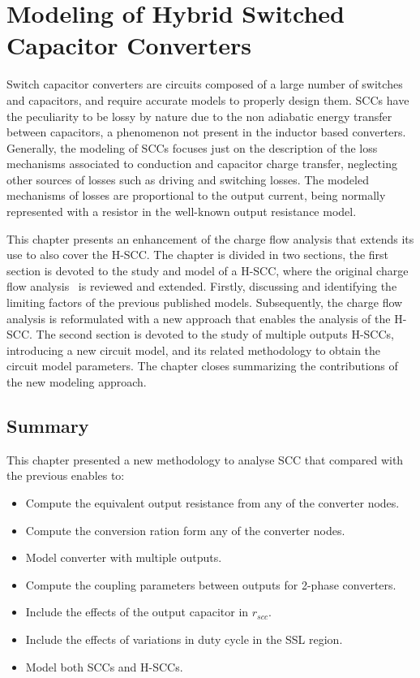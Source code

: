 \chapter[Modeling of H-SCC]{Modeling of Hybrid Switched Capacitor Converters}
\label{ch:modeling}
Switch capacitor converters are circuits composed of a large number of switches and capacitors, and require accurate models to properly design them. SCCs have the peculiarity to be lossy by nature due to the non adiabatic energy transfer between capacitors, a phenomenon not present in the inductor based converters. Generally, the modeling of SCCs focuses just on the description of the loss mechanisms associated to conduction and capacitor charge transfer, neglecting other sources of losses such as driving and switching losses. The modeled mechanisms of losses are proportional to the output current, being  normally represented with a resistor in the well-known output resistance model.

This chapter presents an enhancement of the charge flow analysis that extends its use to also cover the H-SCC.   The chapter is divided in two sections, the first section is devoted to the study and model of a H-SCC, where the original charge flow analysis~\cite{95Makowski,Seeman:EECS-2009-78} is reviewed and extended. Firstly, discussing and identifying the limiting factors of the previous published models. Subsequently, the charge flow analysis is reformulated with a new approach that enables the analysis of the H-SCC. The second section is devoted to the study of multiple outputs H-SCCs, introducing a new circuit model, and its related methodology to obtain the circuit model parameters. The chapter closes summarizing the contributions of the new modeling approach.




\section{Summary}
This chapter presented a new methodology to analyse SCC that compared with the previous enables to: 
\begin{itemize}
  \item Compute the equivalent output resistance from any of the converter nodes.
  \item Compute the conversion ration form any of the converter nodes.
  \item Model converter with multiple outputs.
  \item Compute the coupling parameters between outputs for 2-phase converters.
  \item Include the effects of the output capacitor in $r_{scc}$.
  \item Include the effects of variations in duty cycle in the SSL region.
  \item Model both SCCs and H-SCCs.
\end{itemize}

